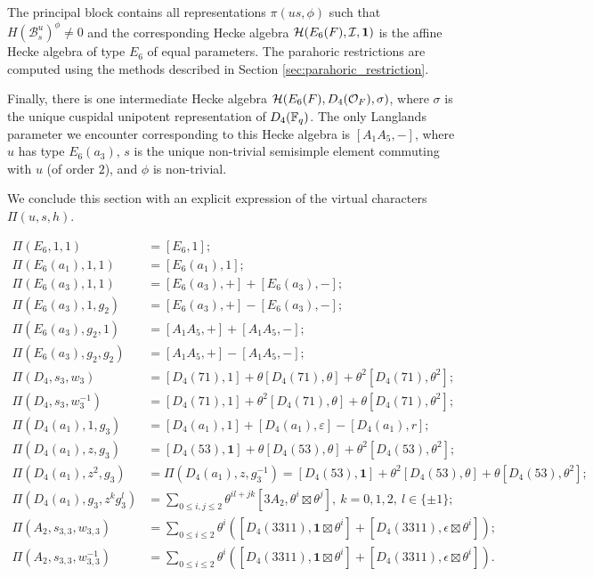 The principal block contains all representations $\pi(us,\phi)$ such that $H(\mathcal{B}^u_s)^\phi\neq 0$ and the corresponding Hecke algebra $\mathcal{H}(E_6(F),\mathcal{I},\mathbf{1})$ is the affine Hecke algebra of type $E_6$ of equal parameters. The parahoric restrictions are computed using the methods described in Section \ref{sec:parahoric_restriction}.

Finally, there is one intermediate Hecke algebra $\mathcal{H}(E_6(F),D_4(\mathcal{O}_F),\sigma)$, where $\sigma$ is the unique cuspidal unipotent representation of $D_4(\mathbb{F}_q)$. The only Langlands parameter we encounter corresponding to this Hecke algebra is $[A_1A_5,-]$, where $u$ has type $E_6(a_3)$, $s$ is the unique non-trivial semisimple element commuting with $u$ (of order $2$), and $\phi$ is non-trivial.

We conclude this section with an explicit expression of the virtual characters $\Pi(u,s,h)$.

\begin{align*}
    \Pi(E_6,1,1)&=[E_6,1];\\
    \Pi(E_6(a_1),1,1)&=[E_6(a_1),1];\\
    \Pi(E_6(a_3),1,1)&=[E_6(a_3),+]+[E_6(a_3),-];\\
    \Pi(E_6(a_3),1,g_2)&=[E_6(a_3),+]-[E_6(a_3),-];\\
    \Pi(E_6(a_3),g_2,1)&=[A_1A_5,+]+[A_1A_5,-];\\
    \Pi(E_6(a_3),g_2,g_2)&=[A_1A_5,+]-[A_1A_5,-];\\
    \Pi(D_4,s_3,w_3)&=[D_4(71),1]+\theta[D_4(71),\theta]+\theta^2[D_4(71),\theta^2];\\
    \Pi(D_4,s_3,w_3^{-1})&=[D_4(71),1]+\theta^2[D_4(71),\theta]+\theta[D_4(71),\theta^2];\\
    \Pi(D_4(a_1),1,g_3)&=[D_4(a_1),1]+[D_4(a_1),\varepsilon]-[D_4(a_1),r];\\
    \Pi(D_4(a_1),z,g_3)&=[D_4(53),\mathbf{1}]+\theta[D_4(53),\theta]+\theta^2[D_4(53),\theta^2];\\
    \Pi(D_4(a_1),z^2,g_3)&=\Pi(D_4(a_1),z,g_3^{-1})=[D_4(53),\mathbf{1}]+\theta^2[D_4(53),\theta]+\theta[D_4(53),\theta^2];\\
    \Pi(D_4(a_1),g_3,z^kg_3^l)&=\sum_{0\leq i,j\leq 2}\theta^{il+jk}[3A_2,\theta^i\boxtimes\theta^j],\ k=0,1,2,\ l\in\{\pm1\};\\
    \Pi(A_2,s_{3,3},w_{3,3})&=\sum_{0\leq i\leq 2} \theta^i([D_4(3311),\mathbf{1}\boxtimes\theta^i]+[D_4(3311),\epsilon\boxtimes\theta^i]);\\
    \Pi(A_2,s_{3,3},w_{3,3}^{-1})&=\sum_{0\leq i\leq 2} \theta^i([D_4(3311),\mathbf{1}\boxtimes\theta^i]+[D_4(3311),\epsilon\boxtimes\theta^i]).\\
\end{align*}

